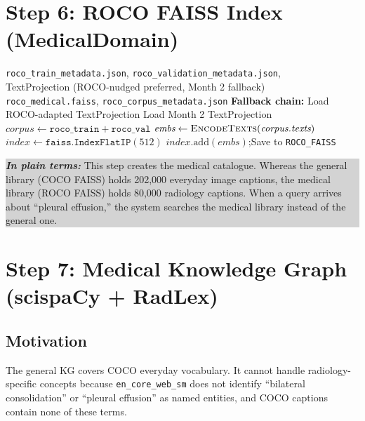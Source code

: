 \documentclass[12pt, a4paper]{article}
\theoremstyle{definition}
\theoremstyle{plain}
\theoremstyle{remark}
\newcommand{\layman}[1]{%
  \vspace{4pt}%
  \noindent\colorbox{lightgray}{\parbox{\dimexpr\linewidth-2\fboxsep}{%
    \textbf{\textit{In plain terms:}} #1}}%
  \vspace{4pt}%
}
\begin{document}
\section{Step 6: ROCO FAISS Index (MedicalDomain)}
\label{sec:roco_faiss}

\begin{algorithm}[H]
\caption{BUILD\_ROCO\_FAISS\_INDEX}
\label{alg:roco_faiss}
\begin{algorithmic}[1]
\Require \texttt{roco\_train\_metadata.json}, \texttt{roco\_validation\_metadata.json},\\
         TextProjection (ROCO-nudged preferred, Month 2 fallback)
\Ensure \texttt{roco\_medical.faiss}, \texttt{roco\_corpus\_metadata.json}
\State \textbf{Fallback chain:}
  \State Load ROCO-adapted TextProjection 
\Else
  \State Load Month 2 TextProjection 
\EndIf
\State $\textit{corpus} \gets \texttt{roco\_train} + \texttt{roco\_val}$ 
\State $\textit{embs} \gets \Call{EncodeTexts}{\textit{corpus.texts}}$ 
\State $\textit{index} \gets \texttt{faiss.IndexFlatIP}(512)$
\State $\textit{index}.\text{add}(\textit{embs})$;\quad Save to \texttt{ROCO\_FAISS}
\end{algorithmic}
\end{algorithm}

\layman{This step creates the medical catalogue. Whereas the general library (COCO FAISS) holds 202,000 everyday image captions, the medical library (ROCO FAISS) holds 80,000 radiology captions. When a query arrives about ``pleural effusion,'' the system searches the medical library instead of the general one.}

\section{Step 7: Medical Knowledge Graph (scispaCy + RadLex)}
\label{sec:kg_medical}

\subsection{Motivation}

The general KG covers COCO everyday vocabulary. It cannot handle radiology-specific concepts because \texttt{en\_core\_web\_sm} does not identify ``bilateral consolidation'' or ``pleural effusion'' as named entities, and COCO captions contain none of these terms.
\end{document}
